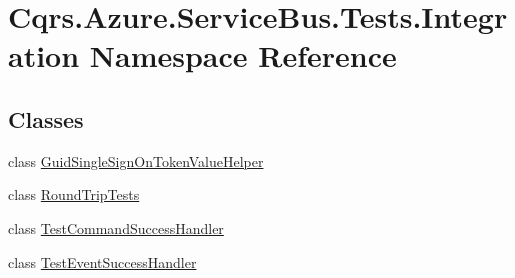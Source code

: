 \hypertarget{namespaceCqrs_1_1Azure_1_1ServiceBus_1_1Tests_1_1Integration}{}\section{Cqrs.\+Azure.\+Service\+Bus.\+Tests.\+Integration Namespace Reference}
\label{namespaceCqrs_1_1Azure_1_1ServiceBus_1_1Tests_1_1Integration}
\subsection*{Classes}
\begin{DoxyCompactItemize}
\item 
class \hyperlink{classCqrs_1_1Azure_1_1ServiceBus_1_1Tests_1_1Integration_1_1GuidSingleSignOnTokenValueHelper}{Guid\+Single\+Sign\+On\+Token\+Value\+Helper}
\item 
class \hyperlink{classCqrs_1_1Azure_1_1ServiceBus_1_1Tests_1_1Integration_1_1RoundTripTests}{Round\+Trip\+Tests}
\item 
class \hyperlink{classCqrs_1_1Azure_1_1ServiceBus_1_1Tests_1_1Integration_1_1TestCommandSuccessHandler}{Test\+Command\+Success\+Handler}
\item 
class \hyperlink{classCqrs_1_1Azure_1_1ServiceBus_1_1Tests_1_1Integration_1_1TestEventSuccessHandler}{Test\+Event\+Success\+Handler}
\end{DoxyCompactItemize}
